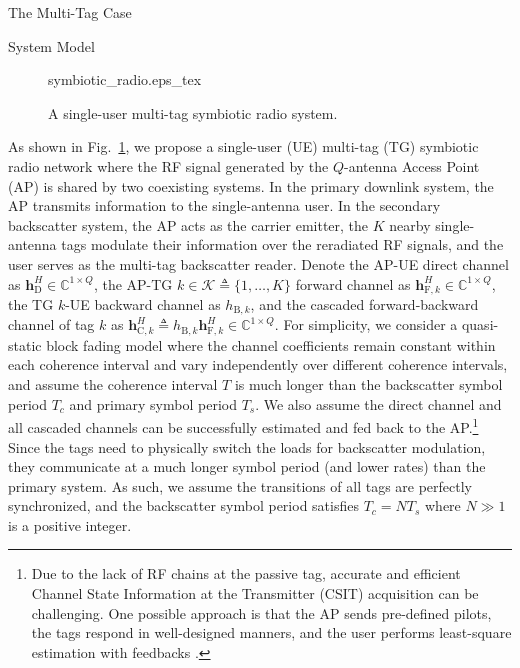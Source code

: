 \documentclass[journal]{IEEEtran}
\begin{document}
	\begin{section}{The Multi-Tag Case}
		\begin{subsection}{System Model}
			\begin{figure}[!t]
				\centering
				\def\svgwidth{0.9\columnwidth}
				{symbiotic_radio.eps_tex}
				\caption{A single-user multi-tag symbiotic radio system.}
				\label{fi:symbiotic_radio}
			\end{figure}
			As shown in Fig.~\ref{fi:symbiotic_radio}, we propose a single-user (UE) multi-tag (TG) symbiotic radio network where the RF signal generated by the $Q$-antenna Access Point (AP) is shared by two coexisting systems. In the primary downlink system, the AP transmits information to the single-antenna user. In the secondary backscatter system, the AP acts as the carrier emitter, the $K$ nearby single-antenna tags modulate their information over the reradiated RF signals, and the user serves as the multi-tag backscatter reader. Denote the AP-UE direct channel as $\boldsymbol{h}_{\mathrm{D}}^H \in \mathbb{C}^{1 \times Q}$, the AP-TG $k \in \mathcal{K} \triangleq \{1,\ldots,K\}$ forward channel as $\boldsymbol{h}_{\mathrm{F},k}^H \in \mathbb{C}^{1 \times Q}$, the TG $k$-UE backward channel as $h_{\mathrm{B},k}$, and the cascaded forward-backward channel of tag $k$ as $\boldsymbol{h}_{\mathrm{C},k}^H \triangleq h_{\mathrm{B},k} \boldsymbol{h}_{\mathrm{F},k}^H \in \mathbb{C}^{1 \times Q}$. For simplicity, we consider a quasi-static block fading model where the channel coefficients remain constant within each coherence interval and vary independently over different coherence intervals, and assume the coherence interval $T$ is much longer than the backscatter symbol period $T_c$ and primary symbol period $T_s$. We also assume the direct channel and all cascaded channels can be successfully estimated and fed back to the AP.\footnote{Due to the lack of RF chains at the passive tag, accurate and efficient Channel State Information at the Transmitter (CSIT) acquisition can be challenging. One possible approach is that the AP sends pre-defined pilots, the tags respond in well-designed manners, and the user performs least-square estimation with feedbacks \cite{Bharadia2015,Yang2015b,Guo2019g}.} Since the tags need to physically switch the loads for backscatter modulation, they communicate at a much longer symbol period (and lower rates) than the primary system. As such, we assume the transitions of all tags are perfectly synchronized, and the backscatter symbol period satisfies $T_c = N T_s$ where $N \gg 1$ is a positive integer.


\end{subsection}
\end{section}
\end{document}
